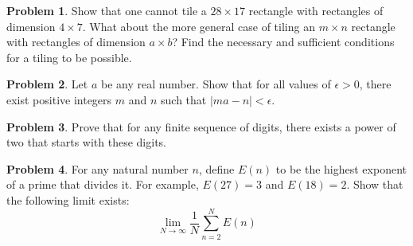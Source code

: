 \documentclass[10pt,a4paper,notitlepage]{article}
\theoremstyle{definition}
\newtheorem{prob}{Problem}
\begin{document}
\begin{prob}
Show that one cannot tile a $28 \times 17$ rectangle with rectangles of dimension $4 \times 7$. What about the more general case of tiling an $m \times n$ rectangle with rectangles of dimension $a \times b$? Find the necessary and sufficient conditions for a tiling to be possible.
\end{prob}

\begin{prob}
Let $a$ be any real number. Show that for all values of $\epsilon>0$, there exist positive integers $m$ and $n$ such that $|ma-n|<\epsilon$.
\end{prob}

\begin{prob}
Prove that for any finite sequence of digits, there exists a power of two that starts with these digits.
\end{prob}

\begin{prob}
For any natural number $n$, define $E(n)$ to be the highest exponent of a prime that divides it. For example, $E(27)=3$ and $E(18)=2$. Show that the following limit exists:
$$\lim_{N\to\infty}\frac{1}{N}\sum_{n=2}^{N}E(n)$$
\end{prob}
\end{document}
